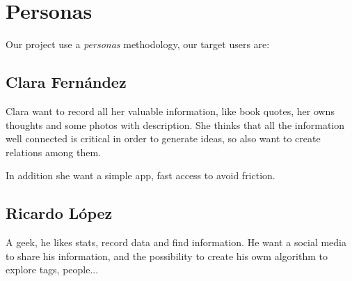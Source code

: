

\section{Personas}  
Our project use a \textit{personas} methodology, our target users are: 

\subsection*{Clara Fernández}  
Clara want to record all her valuable information, like book quotes, her owns thoughts and some photos with description. 
She thinks that all the information well connected is critical in order to generate ideas, so 
also want to create relations among them. 

In addition she want a simple app, fast access to avoid friction.

\subsection*{Ricardo López}
A geek, he likes stats, record data and find information. 
He want a social media to share his information, and the possibility to create his owm algorithm to explore 
tags, people...  
